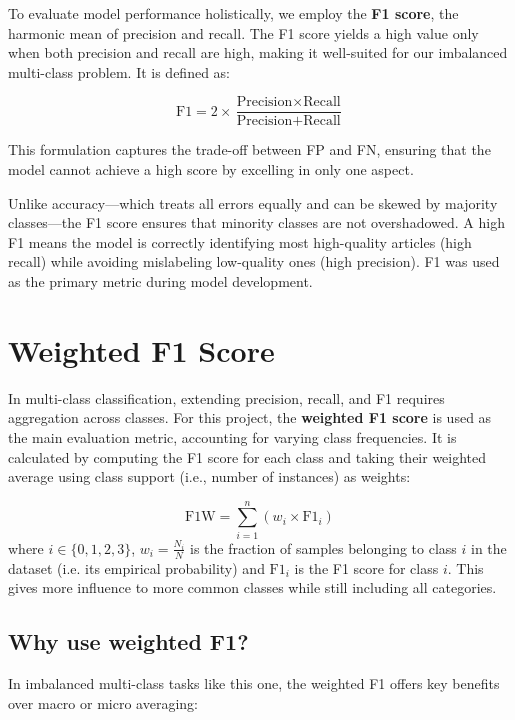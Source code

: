 To evaluate model performance holistically, we employ the \textbf{F1 score}, the harmonic mean of precision and recall. The F1 score yields a high value only when both precision and recall are high, making it well-suited for our imbalanced multi-class problem. It is defined as:

\begin{equation}
\text{F1} = 2 \times \frac{\text{Precision} \times \text{Recall}}{\text{Precision} + \text{Recall}}
\end{equation}

This formulation captures the trade-off between \ac{FP} and \ac{FN}, ensuring that the model cannot achieve a high score by excelling in only one aspect.

Unlike accuracy—which treats all errors equally and can be skewed by majority classes—the F1 score ensures that minority classes are not overshadowed. A high F1 means the model is correctly identifying most high-quality articles (high recall) while avoiding mislabeling low-quality ones (high precision). F1 was used as the primary metric during model development.

\section{Weighted F1 Score}
In multi-class classification, extending precision, recall, and F1 requires aggregation across classes. For this project, the \textbf{weighted F1 score} is used as the main evaluation metric, accounting for varying class frequencies. It is calculated by computing the F1 score for each class and taking their weighted average using class support (i.e., number of instances) as weights:

\begin{equation}
  \text{F1W} = \sum_{i=1}^{n} (w_i \times \text{F1}_i)
  \end{equation}
where $i \in \{0,1,2,3\}$, \(w_i = \frac{N_i}{N}\) is the fraction of samples belonging to class \(i\) in the dataset (i.e. its empirical probability) and \(\text{F1}_i\) is the F1 score for class \(i\).
This gives more influence to more common classes while still including all categories.

\subsection{Why use weighted F1?}
In imbalanced multi-class tasks like this one, the weighted F1 offers key benefits over macro or micro averaging:

